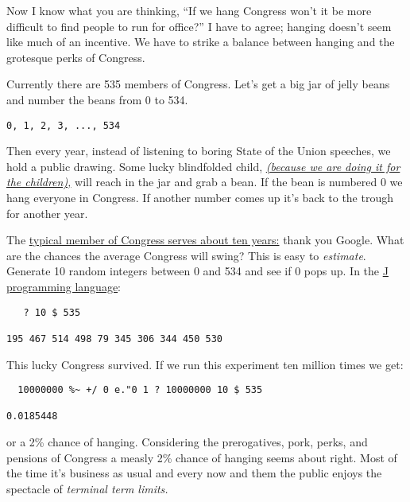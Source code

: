 Now I know what you are thinking, ``If we hang Congress won't it be more
difficult to find people to run for office?'' I have to agree; hanging
doesn't seem like much of an incentive. We have to strike a balance
between hanging and the grotesque perks of Congress.

Currently there are 535 members of Congress. Let's get a big jar of
jelly beans and number the beans from 0 to 534.

\begin{tcolorbox}[breakable, size=fbox, boxrule=1pt, pad at break*=1mm,colback=cellbackground, colframe=cellborder]
\begin{verbatim}
0, 1, 2, 3, ..., 534
\end{verbatim}
\end{tcolorbox}
Then every year, instead of listening to boring State of the Union
speeches, we hold a public drawing. Some lucky blindfolded child,
\emph{\href{http://captaincapitalism.blogspot.com/2009/12/please-stop-it-with-think-of-children.html}{(because
we are doing it for the children),}} will reach in the jar and grab a
bean. If the bean is numbered 0 we hang everyone in Congress. If another
number comes up it's back to the trough for another year.

The
\href{https://digital.library.unt.edu/ark:/67531/metadc29655/m1/1/high_res_d/RL32648_2010Nov02.pdf}{typical
member of Congress serves about ten years:} thank you Google. What are
the chances the average Congress will swing? This is easy to \emph{estimate}.
Generate 10 random integers between 0 and 534 and see if 0 pops up. In
the \href{http://www.jsoftware.com/}{J programming language}:

\begin{tcolorbox}[breakable, size=fbox, boxrule=1pt, pad at break*=1mm,colback=cellbackground, colframe=cellborder]
\begin{verbatim}
   ? 10 $ 535
   
195 467 514 498 79 345 306 344 450 530
\end{verbatim}
\end{tcolorbox}
This lucky Congress survived. If we run this experiment ten
million times we get:

\begin{tcolorbox}[breakable, size=fbox, boxrule=1pt, pad at break*=1mm,colback=cellbackground, colframe=cellborder]
\begin{verbatim}
  10000000 %~ +/ 0 e."0 1 ? 10000000 10 $ 535
  
0.0185448
\end{verbatim}
\end{tcolorbox}
or a 2\% chance of hanging. Considering the prerogatives, pork, perks,
and pensions of Congress a measly 2\% chance of hanging seems about
right. Most of the time it's business as usual and every now and them
the public enjoys the spectacle of \emph{terminal term limits.}



%